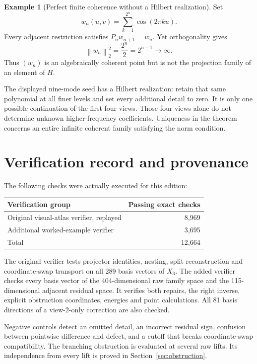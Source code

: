 \documentclass[11pt]{article}
\theoremstyle{definition}
\newtheorem{example}[theorem]{Example}
\theoremstyle{remark}
\newcommand{\norm}[1]{\left\lVert #1\right\rVert}
\begin{document}
\begin{example}[Perfect finite coherence without a Hilbert realization]
Set
\[
 w_n(u,v)=\sum_{k=1}^{2^n}\cos(2\pi k u).
\]
Every adjacent restriction satisfies $P_nw_{n+1}=w_n$. Yet orthogonality gives
\[
 \norm{w_n}_2^2=\frac{2^n}{2}=2^{n-1}\longrightarrow\infty.
\]
Thus $(w_n)$ is an algebraically coherent point but is not the projection family of an element of $H$.
\end{example}

The displayed nine-mode seed has a Hilbert realization: retain that same polynomial at all finer levels and set every additional detail to zero. It is only one possible continuation of the first four views. Those four views alone do not determine unknown higher-frequency coefficients. Uniqueness in the theorem concerns an entire infinite coherent family satisfying the norm condition.

\section{Verification record and provenance}
The following checks were actually executed for this edition:
\begin{center}
\begin{tabular}{@{}lr@{}}
\toprule
Verification group & Passing exact checks\\
\midrule
Original visual-atlas verifier, replayed & 8,969\\
Additional worked-example verifier & 3,695\\
\midrule
Total & 12,664\\
\bottomrule
\end{tabular}
\end{center}
The original verifier tests projector identities, nesting, split reconstruction and coordinate-swap transport on all 289 basis vectors of $X_3$. The added verifier checks every basis vector of the 404-dimensional raw family space and the 115-dimensional adjacent residual space. It verifies both repairs, the right inverse, explicit obstruction coordinates, energies and point calculations. All 81 basis directions of a view-2-only correction are also checked.

Negative controls detect an omitted detail, an incorrect residual sign, confusion between pointwise difference and defect, and a cutoff that breaks coordinate-swap compatibility. The branching obstruction is evaluated at several raw lifts. Its independence from every lift is proved in Section~\ref{sec:obstruction}.
\end{document}

